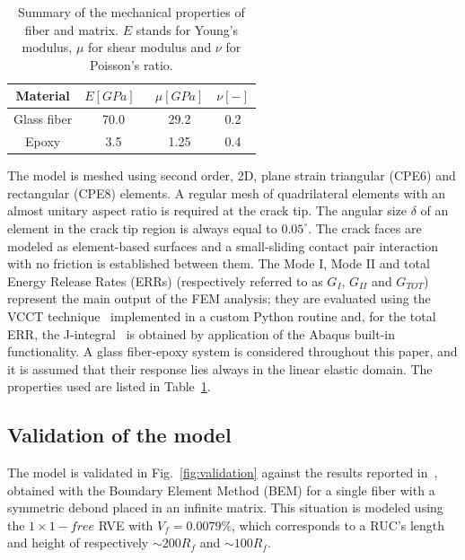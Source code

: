 \documentclass[review]{elsarticle}
\begin{document}
\begin{table}[!htbp]
 \centering
 \caption{Summary of the mechanical properties of fiber and matrix. $E$ stands for Young's modulus, $\mu$ for shear modulus and $\nu$ for Poisson's ratio.}
 \begin{tabular}{cccc}
\textbf{Material} & \textbf{$E\left[GPa\right]$}\ & \textbf{$\mu\left[GPa\right]$} & \textbf{$\nu\left[-\right]$} \\
\midrule
Glass fiber    & 70.0  & 29.2   & 0.2  \\
Epoxy    & 3.5    & 1.25   & 0.4
\end{tabular}
\label{tab:phaseprop}
\end{table}

The model is meshed using second order, 2D, plane strain triangular (CPE6) and rectangular (CPE8) elements. A regular mesh of quadrilateral elements with an almost unitary aspect ratio is required at the crack tip. The angular size $\delta$ of an element in the crack tip region is always equal to $0.05^{\circ}$. The crack faces are modeled as element-based surfaces and a small-sliding contact pair interaction with no friction is established between them. The Mode I, Mode II and total Energy Release Rates (ERRs) (respectively referred to as $G_{I}$, $G_{II}$ and $G_{TOT}$) represent the main output of the FEM analysis; they are evaluated using the VCCT technique~\cite{Krueger2004} implemented in a custom Python routine and, for the total ERR, the J-integral~\cite{Rice1968} is obtained by application of the Abaqus built-in functionality. A glass fiber-epoxy system is considered throughout this paper, and it is assumed that their response lies always in the linear elastic domain. The properties used are listed in Table~\ref{tab:phaseprop}.

\subsection{Validation of the model}

The model is validated in Fig.~\ref{fig:validation} against the results reported in~\cite{Paris2007,Sandino2016}, obtained with the Boundary Element Method (BEM) for a single fiber with a symmetric debond placed in an infinite matrix. This situation is modeled using the $1\times1-free$ RVE with $V_{f}=0.0079\%$, which corresponds to a RUC's length and height of respectively $\sim 200R_{f}$ and $\sim 100R_{f}$.
\end{document}
